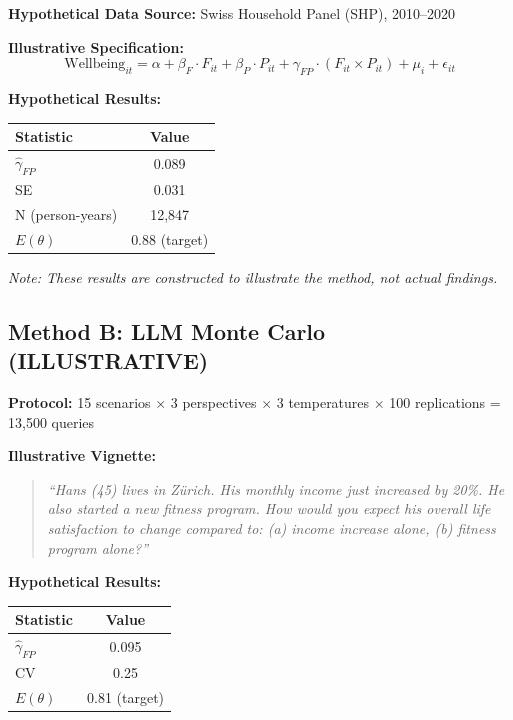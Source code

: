 \documentclass[11pt,a4paper]{article}
\theoremstyle{definition}
\begin{document}
\textbf{Hypothetical Data Source:} Swiss Household Panel (SHP), 2010--2020

\textbf{Illustrative Specification:}
\begin{equation}
\text{Wellbeing}_{it} = \alpha + \beta_F \cdot F_{it} + \beta_P \cdot P_{it} 
    + \gamma_{FP} \cdot (F_{it} \times P_{it}) + \mu_i + \epsilon_{it}
\end{equation}

\textbf{Hypothetical Results:}
\begin{center}
\begin{tabular}{@{}lc@{}}
\toprule
Statistic & Value \\
\midrule
$\hat{\gamma}_{FP}$ & 0.089 \\
SE & 0.031 \\
N (person-years) & 12,847 \\
$E(\theta)$ & 0.88 (target) \\
\bottomrule
\end{tabular}
\end{center}

\textit{Note: These results are constructed to illustrate the method, not actual findings.}

\subsection{Method B: LLM Monte Carlo (ILLUSTRATIVE)}

\textbf{Protocol:} 15 scenarios $\times$ 3 perspectives $\times$ 3 temperatures $\times$ 100 replications = 13,500 queries

\textbf{Illustrative Vignette:}
\begin{quote}
\textit{``Hans (45) lives in Zürich. His monthly income just increased by 20\%. 
He also started a new fitness program. How would you expect his overall 
life satisfaction to change compared to: (a) income increase alone, 
(b) fitness program alone?''}
\end{quote}

\textbf{Hypothetical Results:}
\begin{center}
\begin{tabular}{@{}lc@{}}
\toprule
Statistic & Value \\
\midrule
$\hat{\gamma}_{FP}$ & 0.095 \\
CV & 0.25 \\
$E(\theta)$ & 0.81 (target) \\
\bottomrule
\end{tabular}
\end{center}
\end{document}
